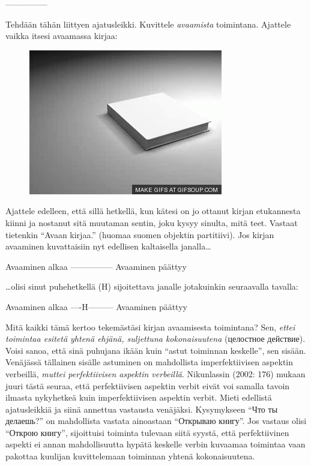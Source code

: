 \documentclass[]{scrartcl}
\begin{document}
\textbar{}---------------\textbar{}

Tehdään tähän liittyen ajatusleikki. Kuvittele \emph{avaamista}
toimintana. Ajattele vaikka itsesi avaamassa kirjaa:

\begin{figure}[htbp]
\centering
\includegraphics{figure/open-book-o.gif}
\caption{}
\end{figure}

Ajattele edelleen, että sillä hetkellä, kun kätesi on jo ottanut kirjan
etukannesta kiinni ja nostanut sitä muutaman sentin, joku kysyy sinulta,
mitä teet. Vastaat tietenkin ``Avaan kirjaa.'' (huomaa suomen objektin
partitiivi). Jos kirjan avaaminen kuvattaisiin nyt edellisen kaltaisella
janalla\ldots{}

Avaaminen alkaa \textbar{}---------------\textbar{} Avaaminen päättyy

\ldots{}olisi sinut puhehetkellä (H) sijoitettava janalle jotakuinkin
seuraavalla tavalla:

Avaaminen alkaa \textbar{}----H---------\textbar{} Avaaminen päättyy

Mitä kaikki tämä kertoo tekemästäsi kirjan avaamisesta toimintana? Sen,
\emph{ettei toimintaa esitetä yhtenä ehjänä, suljettuna kokonaisuutena}
(целостное действие). Voisi sanoa, että sinä puhujana ikään kuin ``astut
toiminnan keskelle'', sen sisään. Venäjässä tällainen sisälle astuminen
on mahdollista imperfektiivisen aspektin verbeillä, \emph{muttei
perfektiivisen aspektin verbeillä}. Nikunlassin (2002: 176) mukaan juuri
tästä seuraa, että perfektiivisen aspektin verbit eivät voi samalla
tavoin ilmasta nykyhetkeä kuin imperfektiivisen aspektin verbit. Mieti
edellistä ajatusleikkiä ja siinä annettua vastausta venäjäksi.
Kysymykseen ``Что ты делаешь?'' on mahdollista vastata ainoastaan
``Открываю книгу''. Jos vastaus olisi ``Открою книгу'', sijoittuisi
toiminta tulevaan siitä syystä, että perfektiivinen aspekti ei annan
mahdollisuutta hypätä keskelle verbin kuvaamaa toimintaa vaan pakottaa
kuulijan kuvittelemaan toiminnan yhtenä kokonaisuutena.
\end{document}
